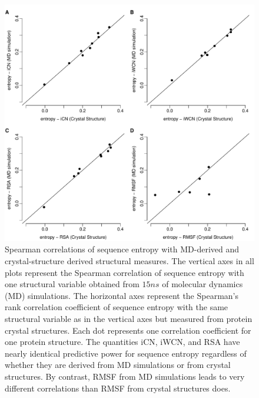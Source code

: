 \documentclass[smallextended]{svjour3}
\begin{document}
\begin{figure}[tbh]
\begin{center}
    \includegraphics[width=6.5in]{cor_cr_md.pdf}
\end{center}
\caption{Spearman correlations of sequence entropy with MD-derived and crystal-structure derived structural measures.
The vertical axes in all plots represent the Spearman correlation of sequence entropy with one structural variable obtained from $15ns$ of molecular dynamics (MD) simulations. The horizontal axes represent the Spearman's rank correlation coefficient of sequence entropy with the same structural variable as in the vertical axes but measured from protein crystal structures. Each dot represents one correlation coefficient for one protein structure. The quantities iCN, iWCN, and RSA have nearly identical predictive power for sequence entropy regardless of whether they are derived from MD simulations or from crystal structures. By contrast, RMSF from MD simulations leads to very different correlations than RMSF from crystal structures does.}
\label{fig:cor_cr_md}
\end{figure}
\end{document}
